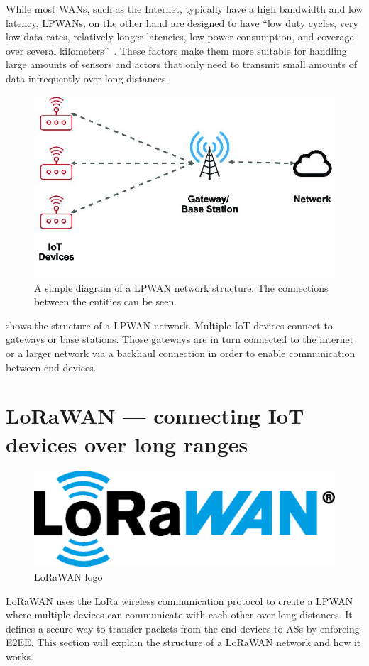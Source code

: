 While most \acp{WAN}, such as the Internet, typically have a high bandwidth and low latency, \acp{LPWAN}, on the other hand are designed to have ``low duty cycles, very low data rates, relatively longer latencies, low power consumption, and coverage over several kilometers''~\cite[p. 289]{kumar_connecting_2023}.
These factors make them more suitable for handling large amounts of sensors and actors that only need to transmit small amounts of data infrequently over long distances.

\begin{figure}[htbp]
    \centering
    \includegraphics[width=.5\textwidth]{pictures/lorawan-structure/lpwan_network_structure.jpg}
    \caption{
        A simple diagram of a \ac{LPWAN} network structure.
        The connections between the entities can be seen.\protect\cite{fernandez_assessing_2020}
    }\label{pic:lpwan-diagram}
\end{figure}

 shows the structure of a \ac{LPWAN} network.
Multiple \ac{IoT} devices connect to gateways or base stations.
Those gateways are in turn connected to the internet or a larger network via a backhaul connection in order to enable communication between end devices.

\section{\acl{LoRaWAN} — connecting \acl{IoT} devices over long ranges}\label{sec:lorawan}

\begin{figure}[htbp]
    \centering
    \includegraphics[width=.3\textwidth]{pictures/logos/LoRaWAN_Logo.eps}
    \caption{
        \ac{LoRaWAN} logo~\protect\cite{lora_alliance_francais_2022}
    }
\end{figure}

\ac{LoRaWAN} uses the \ac{LoRa} wireless communication protocol to create a \ac{LPWAN} where multiple devices can communicate with each other over long distances.
It defines a secure way to transfer packets from the end devices to \acp{AS} by enforcing \ac{E2EE}.
This section will explain the structure of a \ac{LoRaWAN} network and how it works.


